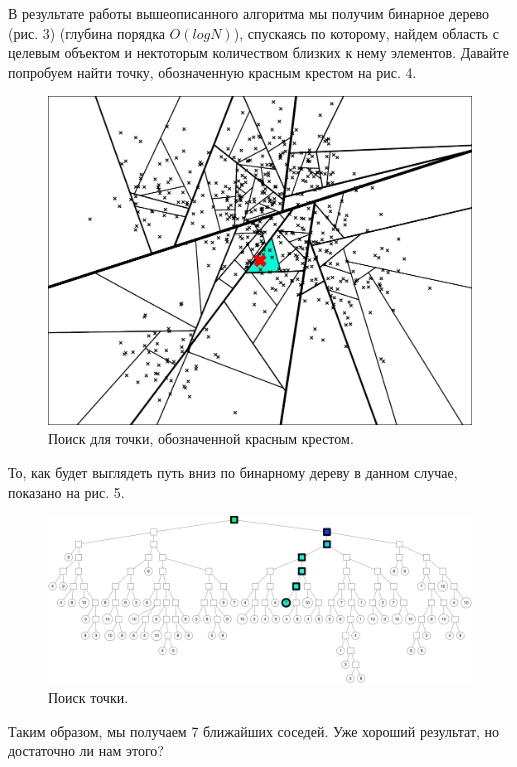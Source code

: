 В результате работы вышеописанного алгоритма мы получим бинарное дерево (рис. 3) (глубина порядка $O(logN)$), спускаясь по которому, найдем область с целевым объектом и нектоторым количеством близких к нему элементов. Давайте попробуем найти точку, обозначенную красным крестом на рис. 4.

\begin{figure}[ht]
    \centering
    \includegraphics[width=\textwidth]{chapters/metric/images/heap-pos.png}
    \caption{Поиск для точки, обозначенной красным крестом.}
    \label{fig:heap-pos}
\end{figure}

То, как будет выглядеть путь вниз по бинарному дереву в данном случае, показано на рис. 5. 

\begin{figure}[ht]
    \centering
    \includegraphics[width=\textwidth]{chapters/metric/images/heap-pos-graphviz.png}
    \caption{Поиск точки.}
    \label{fig:heap-pos-graph}
\end{figure}

Таким образом, мы получаем 7 ближайших соседей. Уже хороший результат, но достаточно ли нам этого?

